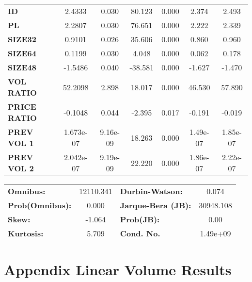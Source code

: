 \documentclass{article}
\begin{document}
\begin{center}
\begin{tabular}{lcccccc}
\textbf{ID}    &       2.4333  &        0.030     &    80.123  &         0.000        &        2.374    &        2.493     \\
\textbf{PL}    &       2.2807  &        0.030     &    76.651  &         0.000        &        2.222    &        2.339     \\
\textbf{SIZE32}    &       0.9101  &        0.026     &    35.606  &         0.000        &        0.860    &        0.960     \\
\textbf{SIZE64}   &       0.1199  &        0.030     &     4.048  &         0.000        &        0.062    &        0.178     \\
\textbf{SIZE48}   &      -1.5486  &        0.040     &   -38.581  &         0.000        &       -1.627    &       -1.470     \\
\textbf{VOL RATIO}   &      52.2098  &        2.898     &    18.017  &         0.000        &       46.530    &       57.890     \\
\textbf{PRICE RATIO}   &      -0.1048  &        0.044     &    -2.395  &         0.017        &       -0.191    &       -0.019     \\
\textbf{PREV VOL 1}   &    1.673e-07  &     9.16e-09     &    18.263  &         0.000        &     1.49e-07    &     1.85e-07     \\
\textbf{PREV VOL 2}   &    2.042e-07  &     9.19e-09     &    22.220  &         0.000        &     1.86e-07    &     2.22e-07     \\
\bottomrule
\end{tabular}
\begin{tabular}{lclc}
\textbf{Omnibus:}       & 12110.341 & \textbf{  Durbin-Watson:     } &     0.074  \\
\textbf{Prob(Omnibus):} &    0.000  & \textbf{  Jarque-Bera (JB):  } & 30948.108  \\
\textbf{Skew:}          &   -1.064  & \textbf{  Prob(JB):          } &      0.00  \\
\textbf{Kurtosis:}      &    5.709  & \textbf{  Cond. No.          } &  1.49e+09  \\
\bottomrule
\end{tabular}
\end{center}


{}


\appendix

\section{Appendix Linear Volume Results}
\end{document}
